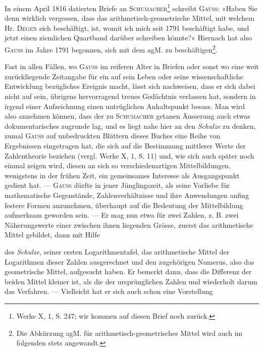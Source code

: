 In einem April 1816 datierten Briefe an \textsc{Schumacher}\footnote{Werke X, 1, S. 247; wir kommen auf diesen Brief noch zurück.} schreibt \textsc{Gauss}:
»Haben Sie denn wirklich vergessen, dass das arithmetisch-geometrische Mittel,
mit welchem Hr. \textsc{Degen} sich beschäftigt,  ist, womit ich mich
seit 1791 beschäftigt habe, und jetzt einen ziemlichen Quartband darüber
schreiben könnte?« Hiernach hat also \textsc{Gauss} im Jahre 1791 begonnen, sich
mit dem agM. zu beschäftigen\footnote{Die Abkürzung agM. für arithmetisch-geometrisches Mittel wird auch im folgenden stets angewandt.}.

Fast in allen Fällen, wo \textsc{Gauss} im reiferen Alter in Briefen oder sonst
wo eine weit zurückliegende Zeitangabe für ein auf sein Leben oder seine
wissenschaftliche Entwicklung bezügliches Ereignis macht, lässt sich nachweisen,
dass er sich dabei nicht auf sein, übrigens hervorragend treues Gedächtnis
verlassen hat, sondern in irgend einer Aufzeichnung einen untrüglichen Anhaltspunkt
besass. Man wird also annehmen können, dass der zu \textsc{Schumacher}
getanen Äusserung auch etwas dokumentarisches zugrunde lag, und es liegt
nahe hier an den \textit{Schulze} zu denken, zumal \textsc{Gauss} auf unbedruckten Blättern
dieses Buches eine Reihe von Ergebnissen eingetragen hat, die sich auf die
Bestimmung mittlerer Werte der Zahlentheorie beziehen (vergl. Werke X, 1,
S. 11) und, wie sich auch später noch einmal zeigen wird, diesen an sich so
verschiedenartigen Mittelbildungen, wenigstens in der frühen Zeit, ein gemeinsames
Interesse als Ausgangspunkt gedient hat. — \textsc{Gauss} dürfte in jener
Jünglingszeit, als seine Vorliebe für mathematische Gegenstände, Zahlenverhältnisse
und ihre Anwendungen anfing festere Formen anzunehmen, überhaupt
auf die Bedeutung der Mittelbildung aufmerksam geworden sein. — Er mag
nun etwa für zwei Zahlen, z. B. zwei Näherungswerte einer zwischen ihnen
liegenden Grösse, zuerst das arithmetische Mittel gebildet, dann mit Hilfe\par
\HistoricalFoot{}{2\textsuperscript{*}}
\clearpage{}
\noindent des \textit{Schulze}, seiner ersten Logarithmentafel, das arithmetische Mittel der Logarithmen
dieser Zahlen ausgerechnet und den zugehörigen Numerus, also das
geometrische Mittel, aufgesucht haben. Er bemerkt dann, dass die Differenz
der beiden Mittel kleiner ist, als die der ursprünglichen Zahlen und wiederholt
darum das Verfahren. — Vielleicht hat er sich auch schon eine Vorstellung
